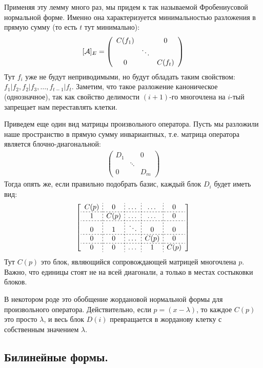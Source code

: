 Применяя эту лемму много раз, мы придем к так называемой Фробениусовой нормальной форме.
Именно она характеризуется минимальностью разложения в прямую сумму (то есть $t$ тут минимально):
    \[
  [ \mathcal{A} ]_{E} = \left(\begin{array}{ccc}
  C(f_1) &  & 0 \\ 
   & \ddots &  \\ 
  0 &  & C(f_t)
  \end{array}\right)  
\]
Тут $f_i$ уже не будут неприводимыми, но будут обладать таким свойством: $f_1 | f_2, f_2 | f_3, \dots, f_{t - 1} | f_t$.
Заметим, что такое разложение каноническое (однозначное), так как свойство делимости $(i + 1)$-го многочлена на $i$-тый запрещает нам переставлять клетки.

Приведем еще один вид матрицы произвольного оператора.
Пусть мы разложили наше пространство в прямую сумму инвариантных, т.е. матрица оператора является блочно-диагональной: \begin{gather*}
    \begin{pmatrix}
        D_1 &  & 0 \\ 
        & \ddots &  \\ 
        0 &  & D_m
    \end{pmatrix}
\end{gather*}
Тогда опять же, если правильно подобрать базис, каждый блок $D_i$ будет иметь вид: 
$$
\left[
    \begin{array}{c;{2pt/2pt}c;{2pt/2pt}c;{2pt/2pt}c;{2pt/2pt}cc}
        C(p) & 0 & \dots & \dots & 0 \\ \hdashline[2pt/2pt]
        1 & C(p) & \dots & \dots & 0 \\ \hdashline[2pt/2pt]
        0 & 1 & \ddots & 0 & 0 \\ \hdashline[2pt/2pt]
        0 & 0 & \dots & C(p) & 0 \\ \hdashline[2pt/2pt]
        0 & 0 & \dots & 1 & C(p)
    \end{array}
\right]
$$
Тут $C(p)$ это блок, являющийся сопровождающей матрицей многочлена $p$.
Важно, что единицы стоят не на всей диагонали, а только в местах состыковки блоков.

В некотором роде это обобщение жордановой нормальной формы для произвольного оператора.
Действительно, если $p = (x - \lambda)$, то каждое $C(p)$ это просто $\lambda$, и весь блок $D(i)$ превращается в жорданову клетку с собственным значением $\lambda$.


\subsection{Билинейные формы.}

